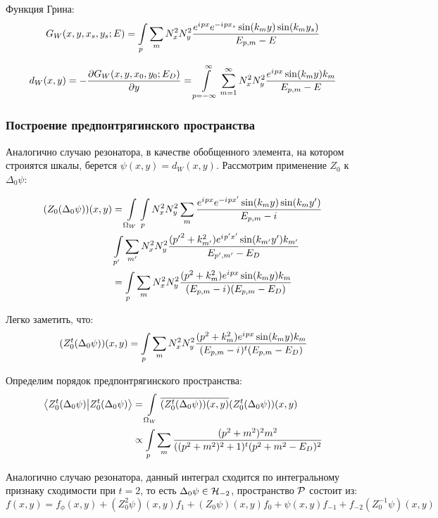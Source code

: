 Функция Грина:
\[
G_W(x, y, x_s, y_s; E) = \int\limits_p \sum\limits_m N_x^2 N_y^2 \frac{e^{{i\mkern1mu} p x} e^{-{i\mkern1mu} p x_s} \sin(k_m y) \sin(k_m y_s)}{E_{p, m} - E}
\]

\begin{align*}
d_W(x, y) = -\pdv{G_W(x, y, x_0, y_0; E_D)}{y} (x, y) = \int\limits_{p = -\infty}^\infty \sum\limits_{m = 1}^\infty N_x^2 N_y^2 \frac{e^{{i\mkern1mu} p x} \sin(k_m y) k_m }{E_{p, m} - E}
\end{align*}

\subsubsection{Построение предпонтрягинского пространства}
Аналогично случаю резонатора, в качестве обобщенного элемента, на котором строиятся шкалы, берется $\psi(x, y) = d_W(x, y)$. Рассмотрим применение $Z_0$ к $\Delta_0 \psi$:

\begin{align*}
(Z_0 (\Delta_0 \psi))(x, y)
&= \int\limits_{\Omega_W} \int\limits_p N_x^2 N_y^2 \sum\limits_m \frac{e^{{i\mkern1mu} p x} e^{-{i\mkern1mu} p x'} \sin(k_m y) \sin(k_m y')}{E_{p, m} - {i\mkern1mu}} \\
&  \int\limits_{p'} \sum\limits_{m'} N_x^2 N_y^2  \frac{({p'}^2 + k_{m'}^2) e^{{i\mkern1mu} p' x'} \sin(k_{m'} y') k_{m'} }{E_{p', m'} - E_D} \\
&= \int\limits_p \sum\limits_m N_x^2 N_y^2 \frac{(p^2 + k_m^2) e^{{i\mkern1mu} p x} \sin(k_m y) k_m}{(E_{p, m} - {i\mkern1mu}) (E_{p, m} - E_D)}
\end{align*}

Легко заметить, что:
\begin{align*}
(Z_0^t (\Delta_0 \psi))(x, y) =
\int\limits_p \sum\limits_m N_x^2 N_y^2  \frac{(p^2 + k_m^2) e^{{i\mkern1mu} p x} \sin(k_m y) k_m}{(E_{p, m} - {i\mkern1mu})^t (E_{p, m} - E_D)}
\end{align*}

Определим порядок предпонтрягинского пространства:
\begin{align*}
\ip{Z_0^t (\Delta_0 \psi)}{Z_0^t (\Delta_0 \psi)}
&= \int\limits_{\Omega_W} \cconj{(Z_0^t (\Delta_0 \psi))(x, y)} (Z_0^t (\Delta_0 \psi))(x, y) \\
&\propto \int\limits_p \sum\limits_m \frac{(p^2 + m^2)^2 m^2}{((p^2 + m^2)^{2} + 1)^t (p^2 + m^2 - E_D)^2}
\end{align*}

Аналогично случаю резонатора, данный интеграл сходится по интегральному признаку сходимости при $t = 2$, то есть $\Delta_0 \psi \in \mathcal{H}_{-2}$, пространство $\mathcal{P}$ состоит из:
\[
f(x, y) = f_\phi(x, y) + (Z_0^2 \psi)(x, y) f_1 + (Z_0 \psi)(x, y) f_0 + \psi(x, y) f_{-1} + f_{-2} (Z_0^{-1} \psi)(x, y)
\]

